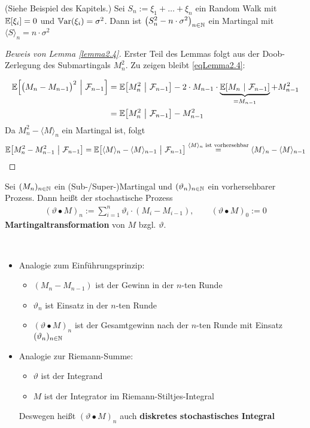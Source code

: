 \begin{beisp} %
(Siehe Beispiel des Kapitels.) Sei $S_n:=\xi_1+\ldots+\xi_n$ ein Random Walk mit $\mathbb{E}[\xi_i]=0$ und $\mathbb{V}\text{ar}(\xi_i)=\sigma^2$. Dann ist
$\big(S_n^2-n\cdot\sigma^2\big)_{n\in\mathbb{N}}$ ein Martingal mit $\langle S\rangle_n=n\cdot\sigma^2$
\end{beisp}

\begin{proof}[Beweis von Lemma \ref{lemma2.4}]\enter
Erster Teil des Lemmas folgt aus der Doob-Zerlegung des Submartingals $M_n^2$. Zu zeigen bleibt \eqref{eqLemma2.4}:

\begin{align*}
\mathbb{E}\Big[\big(M_n-M_{n-1}\big)^2~\Big|~\mathcal{F}_{n-1}\Big]
&=\mathbb{E}\big[M_n^2~\big|~\mathcal{F}_{n-1}\big]-2\cdot M_{n-1}\cdot\underbrace{\mathbb{E}[M_n~|~\mathcal{F}_{n-1}]}_{=M_{n-1}}+M^2_{n-1}\\
&=\mathbb{E}\big[M_n^2~\big|~\mathcal{F}_{n-1}\big] - M_{n-1}^2
\end{align*}
Da $M_n^2-\langle M\rangle_n$ ein Martingal ist, folgt
\begin{align*}
\mathbb{E}\big[M_n^2-M_{n-1}^2~\big|~\mathcal{F}_{n-1}\big]
=\mathbb{E}\big[\langle M\rangle_n-\langle M\rangle_{n-1}~\big|~\mathcal{F}_{n-1}\big]
\stackrel{\langle M\rangle_n\text{ ist vorhersehbar}}{=}\langle M\rangle_n-\langle M\rangle_{n-1}
\end{align*}
\end{proof}

\begin{defi} %
Sei $(M_n)_{n\in\mathbb{N}}$ ein (Sub-/Super-)Martingal und $(\vartheta_n)_{n\in\mathbb{N}}$ ein vorhersehbarer Prozess. Dann heißt der stochastische Prozess
\begin{align*}
(\vartheta\bullet M)_n:=\sum\limits_{i=1}^n\vartheta_i\cdot(M_i-M_{i-1}),\qquad(\vartheta\bullet M)_0:=0
\end{align*} 
\textbf{Martingaltransformation} von $M$ bzgl. $\vartheta$.
\end{defi}

\begin{bemerkung}\ %
\begin{itemize}
\item Analogie zum Einführungsprinzip:
\begin{itemize}
\item $(M_n-M_{n-1})$ ist der Gewinn in der $n$-ten Runde
\item $\vartheta_n$ ist Einsatz in der $n$-ten Runde
\item $(\vartheta\bullet M)_n$ ist der Gesamtgewinn nach der $n$-ten Runde mit Einsatz $(\vartheta_n)_{n\in\mathbb{N}}$
\end{itemize}
\item Analogie zur Riemann-Summe:
\begin{itemize}
\item $\vartheta$ ist der Integrand
\item $M$ ist der Integrator im Riemann-Stiltjes-Integral
\end{itemize}
Deswegen heißt $(\vartheta\bullet M)_n$ auch \textbf{diskretes stochastisches Integral}
\end{itemize}
\end{bemerkung}

